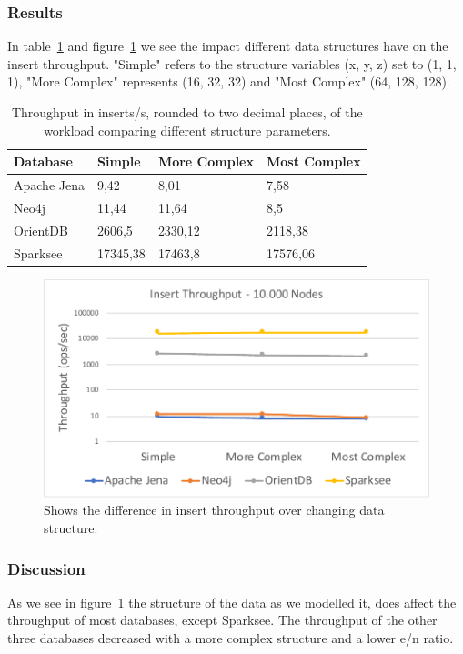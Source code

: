 \subsubsection{Results}
In table~\ref{tab:structure} and figure~\ref{fig:structure} we see the impact different data structures have on the insert throughput.
"Simple" refers to the structure variables (x, y, z) set to (1, 1, 1),
"More Complex" represents (16, 32, 32) and "Most Complex" (64, 128, 128).

\begin{table}[h!]
  \begin{minipage}{\textwidth}
    \centering
    \begin{tabular}{ | l | l | l | l | }
      \hline
      Database & Simple & More Complex & Most Complex \\ \hline
      Apache Jena & 9,42 & 8,01 & 7,58 \\ \hline
      Neo4j & 11,44 & 11,64 & 8,5 \\ \hline
      OrientDB & 2606,5 & 2330,12 & 2118,38 \\ \hline
      Sparksee & 17345,38 & 17463,8 & 17576,06 \\ \hline
    \end{tabular}
  \end{minipage}
  \caption{Throughput in inserts/s, rounded to two decimal places, of the workload comparing different structure parameters.}
  \label{tab:structure}
\end{table}

\begin{figure}[h!]
  \centering
  \includegraphics[width=.75\textwidth]{images/production/structure}
  \caption{Shows the difference in insert throughput over changing data structure.}
  \label{fig:structure}
\end{figure}

\subsubsection{Discussion}
As we see in figure~\ref{fig:structure} the structure of the data as we modelled it,
does affect the throughput of most databases, except Sparksee.
The throughput of the other three databases decreased with a more complex structure and a lower e/n ratio.

